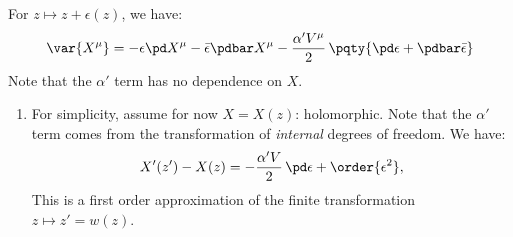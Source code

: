 \documentclass[a4paper,10pt]{article}
\begin{document}
\begin{enumerate}
	For $z\mapsto z + \epsilon(z)$, we have:
	\begin{equation}
		\var{X^\mu}
		= - \epsilon\pd X^\mu
			- \bar{\epsilon}\pdbar X^\mu
			- \frac{\alpha'V^\mu}{2}\,\pqty{
				\pd\epsilon
				+ \pdbar\bar{\epsilon}
			}
	\end{equation}
	Note that the $\alpha'$ term has no dependence on $X$. 
	
	\begin{enumerate}
	\item For simplicity, assume for now $X = X(z)$: holomorphic. Note that the $\alpha'$ term comes from the transformation of \textit{internal} degrees of freedom. We have:
	\begin{gather}
		X'(z') - X(z)
		= -\frac{\alpha' V}{2}\,\pd\epsilon
			+ \order{\epsilon^2},
		\label{eq:dilaton_holomorphic}
	\end{gather}
	This is a first order approximation of the finite transformation $z\mapsto z' = w(z)$. 
	

\end{enumerate}
\end{enumerate}
\end{document}
